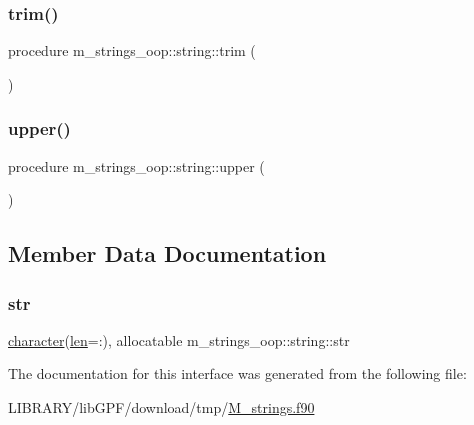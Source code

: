 \mbox{\label{structm__strings__oop_1_1string_a761cabaa770f1eb3311e9ceedeac4a24}} 
\subsubsection{\texorpdfstring{trim()}{trim()}}
{\footnotesize\ttfamily procedure m\+\_\+strings\+\_\+oop\+::string\+::trim (\begin{DoxyParamCaption}{ }\end{DoxyParamCaption})\hspace{0.3cm}{\ttfamily [private]}}

\mbox{\label{structm__strings__oop_1_1string_ac4852f9fcb37135cfb6d368cc6cef2fe}} 
\subsubsection{\texorpdfstring{upper()}{upper()}}
{\footnotesize\ttfamily procedure m\+\_\+strings\+\_\+oop\+::string\+::upper (\begin{DoxyParamCaption}{ }\end{DoxyParamCaption})\hspace{0.3cm}{\ttfamily [private]}}



\subsection{Member Data Documentation}
\mbox{\label{structm__strings__oop_1_1string_a52469ac69ef806468520b42894ca5e77}} 
\subsubsection{\texorpdfstring{str}{str}}
{\footnotesize\ttfamily \hyperlink{option__stopwatch_83_8txt_abd4b21fbbd175834027b5224bfe97e66}{character}(\hyperlink{structm__strings__oop_1_1string_acd9093a5a0ca686837cce1908846ae53}{len}=\+:), allocatable m\+\_\+strings\+\_\+oop\+::string\+::str\hspace{0.3cm}{\ttfamily [private]}}



The documentation for this interface was generated from the following file\+:\begin{DoxyCompactItemize}
\item 
L\+I\+B\+R\+A\+R\+Y/lib\+G\+P\+F/download/tmp/\hyperlink{M__strings_8f90}{M\+\_\+strings.\+f90}\end{DoxyCompactItemize}
